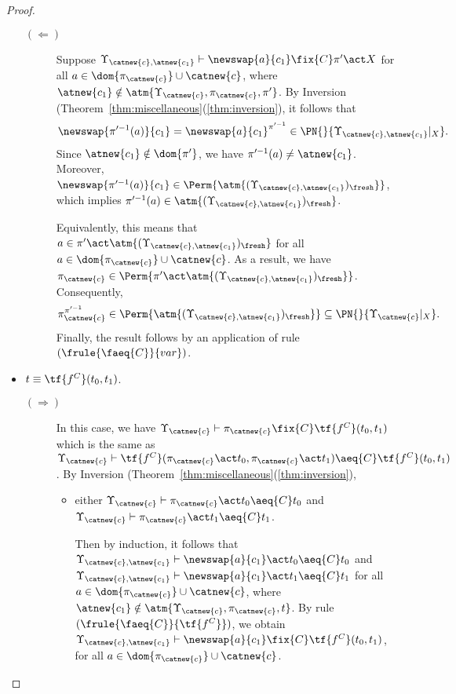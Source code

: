 \begin{proof}
\begin{itemize}
\begin{description}
            \item[$(\Leftarrow)$] Suppose $\Upsilon_{\catnew{c},\atnew{c_1}} \vdash \newswap{a}{c_1}\fix{C} \pi'\act X$ for all $a \in \dom{\pi_{\catnew{c}}} \cup \catnew{c}$, where $\atnew{c_1} \notin \atm{\Upsilon_{\catnew{c}},\pi_{\catnew{c}},\pi'}$. By Inversion (Theorem~\ref{thm:miscellaneous}(\ref{thm:inversion}), it follows that
            \[
                \newswap{\pi'^{-1}(a)}{c_1} = \newswap{a}{c_1}^{\pi'^{-1}} \in \PN{}{\Upsilon_{\catnew{c},\atnew{c_1}}|_X}.
            \]
            Since $\atnew{c_1} \notin \dom{\pi'}$, we have $\pi'^{-1}(a) \neq \atnew{c_1}$. Moreover, $\newswap{\pi'^{-1}(a)}{c_1}\in \Perm{\atm{(\Upsilon_{\catnew{c},\atnew{c_1}})_{\fresh}}}$, which implies $\pi'^{-1}(a) \in \atm{(\Upsilon_{\catnew{c},\atnew{c_1}})_{\fresh}}$.

            Equivalently, this means that $a \in \pi'\act\atm{(\Upsilon_{\catnew{c},\atnew{c_1}})_{\fresh}}$ for all $a \in \dom{\pi_{\catnew{c}}} \cup \catnew{c}$. As a result, we have $\pi_{\catnew{c}} \in \Perm{\pi'\act\atm{(\Upsilon_{\catnew{c},\atnew{c_1}})_{\fresh}}}$. Consequently,
            \[
                \pi_{\catnew{c}}^{\pi'^{-1}} \in \Perm{\atm{(\Upsilon_{\catnew{c},\atnew{c_1}})_{\fresh}}} \subseteq \PN{}{\Upsilon_{\catnew{c}}|_X}.
            \]
            Finally, the result follows by an application of rule $(\frule{\faeq{C}}{var})$.
        \end{description}

        \item $t \equiv \tf{f^C}(t_0,t_1)$.

        \begin{description}
            \item[$(\Rightarrow)$] In this case, we have $\Upsilon_{\catnew{c}} \vdash \pi_{\catnew{c}} \fix{C} \tf{f^C}(t_0,t_1)$ which is the same as $\Upsilon_{\catnew{c}} \vdash\tf{f^C}( \pi_{\catnew{c}}\act t_0, \pi_{\catnew{c}}\act t_1) \aeq{C} \tf{f^C}(t_0,t_1)$. By Inversion (Theorem~\ref{thm:miscellaneous}(\ref{thm:inversion}),

            \begin{itemize}
                \item either $\Upsilon_{\catnew{c}} \vdash \pi_{\catnew{c}}\act t_0 \aeq{C} t_0$ and $\Upsilon_{\catnew{c}} \vdash \pi_{\catnew{c}}\act t_1 \aeq{C} t_1$.

                Then by induction, it follows that $\Upsilon_{\catnew{c},\atnew{c_1}} \vdash \newswap{a}{c_1}\act t_0\aeq{C} t_0$ and $\Upsilon_{\catnew{c},\atnew{c_1}} \vdash \newswap{a}{c_1}\act t_1\aeq{C} t_1$ for all $a \in \dom{\pi_{\catnew{c}}} \cup \catnew{c}$, where $\atnew{c_1} \notin \atm{\Upsilon_{\catnew{c}},\pi_{\catnew{c}}, t}$. By rule $(\frule{\faeq{C}}{\tf{f^C}})$, we obtain $\Upsilon_{\catnew{c},\atnew{c_1}} \vdash \newswap{a}{c_1}\fix{C} \tf{f^C}(t_0,t_1) $, for all $a \in \dom{\pi_{\catnew{c}}} \cup \catnew{c}$.



\end{itemize}
\end{description}
\end{itemize}
\end{proof}
